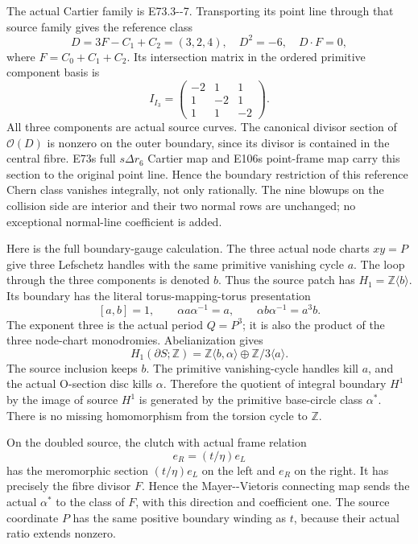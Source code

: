 The actual Cartier family is E73.3-\/-7. Transporting its point line through that source family gives the reference class
\[
 D=3F-C_1+C_2=(3,2,4),\quad
 D^2=-6,\quad D\cdot F=0,
 \tag{E108.2}
\]
where \(F=C_0+C_1+C_2\). Its intersection matrix in the ordered primitive component basis is
\[
 I_{I_3}=\begin{pmatrix}-2&1&1\\1&-2&1\\1&1&-2\end{pmatrix}.
 \tag{E108.3}
\]
All three components are actual source curves. The canonical divisor section of \(\mathcal O(D)\) is nonzero on the outer boundary, since its divisor is contained in the central fibre. E73\textquotesingle s full \(s\Delta r_6\) Cartier map and E106\textquotesingle s point-frame map carry this section to the original point line. Hence the boundary restriction of this reference Chern class vanishes integrally, not only rationally. The nine blowups on the collision side are interior and their two normal rows are unchanged; no exceptional normal-line coefficient is added.

Here is the full boundary-gauge calculation. The three actual node charts \(xy=P\) give three Lefschetz handles with the same primitive vanishing cycle \(a\). The loop through the three components is denoted \(b\). Thus the source patch has \(H_1=\mathbb Z\langle b\rangle\). Its boundary has the literal torus-mapping-torus presentation
\[
 [a,b]=1,\qquad \alpha a\alpha^{-1}=a,\qquad
 \alpha b\alpha^{-1}=a^3b.
 \tag{E108.4}
\]
The exponent three is the actual period \(Q=P^3\); it is also the product of the three node-chart monodromies. Abelianization gives
\[
 H_1(\partial S;\mathbb Z)
   =\mathbb Z\langle b,\alpha\rangle\oplus
     \mathbb Z/3\langle a\rangle.
 \tag{E108.5}
\]
The source inclusion keeps \(b\). The primitive vanishing-cycle handles kill \(a\), and the actual O-section disc kills \(\alpha\). Therefore the quotient of integral boundary \(H^1\) by the image of source \(H^1\) is generated by the primitive base-circle class \(\alpha^*\). There is no missing homomorphism from the torsion cycle to \(\mathbb Z\).

On the doubled source, the clutch with actual frame relation
\[
                    e_R=(t/\eta)e_L
 \tag{E108.6}
\]
has the meromorphic section \((t/\eta)e_L\) on the left and \(e_R\) on the right. It has precisely the fibre divisor \(F\). Hence the Mayer-\/-Vietoris connecting map sends the actual \(\alpha^*\) to the class of \(F\), with this direction and coefficient one. The source coordinate \(P\) has the same positive boundary winding as \(t\), because their actual ratio extends nonzero.


